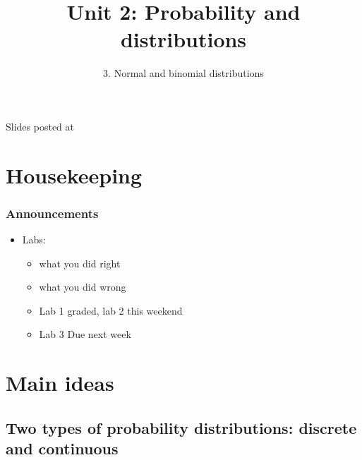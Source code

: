 \documentclass[slidestop,compress,mathserif,10pt,t,professionalfonts,xcolor=table]{beamer}
\title{Unit 2: Probability and distributions}
\subtitle{3. Normal and binomial distributions}
\author{\CourseName}
\date{}
\institute{\InstituteName}
\begin{document}



\begin{frame}[plain]

\titlepage

\vfill

{\scriptsize {} \hfill Slides posted at  \webURL{\CourseSite}}

\addtocounter{framenumber}{-1} 

\end{frame}


\section{Housekeeping}


\begin{frame}
\frametitle{Announcements}

\begin{itemize}

\item Labs:
\begin{itemize}
\item what you did right \pause
\item what you did wrong \pause
\item Lab 1 graded, lab 2 this weekend \pause
\item Lab 3 Due next week

\end{itemize}



\end{itemize}

\end{frame}


\section{Main ideas}


\subsection{Two types of probability distributions: discrete and continuous}
\label{mi1}
\end{document}
